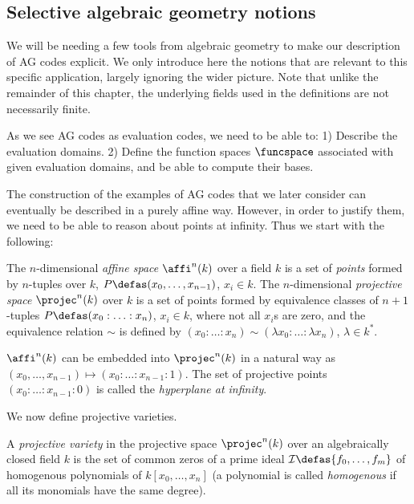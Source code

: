 \subsection{Selective algebraic geometry notions}

We will be needing a few tools from algebraic geometry to make our description of AG codes explicit. We only introduce
here the notions that are relevant to this specific application,
largely ignoring the wider picture. Note that unlike the remainder of this chapter, the underlying fields used in the definitions
are not necessarily finite.

As we see AG codes as evaluation codes, we need to be able to: 1) Describe the evaluation domains.
2) Define the function spaces $\funcspace$ associated with given evaluation domains,
and be able to compute their bases.

\medskip

The construction of the examples of AG codes that we later consider can eventually be described in a purely affine way. However, in order to
justify them, we need to be able to reason about points at infinity. Thus we start with the following:

\begin{defi}
\label{def:affiprojec}
The $n$-dimensional \emph{affine space} $\affi^n(k)$ over a field $k$ is a set of \emph{points} formed by $n$-tuples over $k$,
$P \defas (x_0, \ldots, x_{n-1})$, $x_i \in k$.
The $n$-dimensional \emph{projective space} $\projec^n(k)$ over $k$ is a set of points formed by equivalence classes of $n+1$-tuples
$P \defas (x_0 : \ldots : x_n)$, $x_i \in k$, where not all $x_i$s are zero, and the equivalence relation $\sim$ is
defined by $(x_0 : \ldots : x_n) \sim (\lambda x_0 : \ldots : \lambda x_n)$, $\lambda \in k^*$.

\noindent
$\affi^n(k)$ can be embedded into $\projec^n(k)$ in a natural way as $(x_0, \ldots, x_{n-1}) \mapsto (x_0 : \ldots : x_{n-1} : 1)$.
The set of projective points $(x_0 : \ldots : x_{n-1} : 0)$ is called the \emph{hyperplane at infinity}.
\end{defi}

We now define projective varieties.

\begin{defi}
A \emph{projective variety} in the projective space $\projec^n(k)$ over an algebraically closed field $k$ is the set of common zeros
of a prime ideal $\mathcal{I} \defas \{f_0, \ldots, f_m\}$ of homogenous polynomials of $k[x_0,\ldots,x_n]$ (a polynomial is called \emph{homogenous}
if all its monomials have the same degree).
\end{defi}

